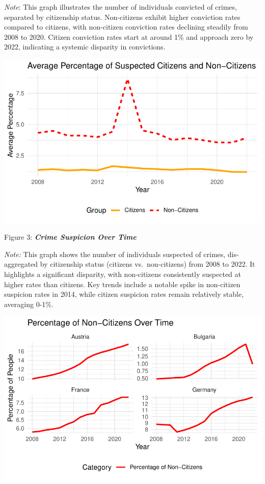 \documentclass[
]{article}
\begin{document}
\emph{Note}: This graph illustrates the number of individuals convicted
of crimes, separated by citizenship status. Non-citizens exhibit higher
conviction rates compared to citizens, with non-citizen conviction rates
declining steadily from 2008 to 2020. Citizen conviction rates start at
around 1\% and approach zero by 2022, indicating a systemic disparity in
convictions.

\includegraphics{DataMan_Project_files/figure-pdf/unnamed-chunk-26-1.pdf}

Figure 3: \textbf{\emph{Crime Suspicion Over Time}}

\emph{Note:} This graph shows the number of individuals suspected of
crimes, dis-aggregated by citizenship status (citizens vs.~non-citizens)
from 2008 to 2022. It highlights a significant disparity, with
non-citizens consistently suspected at higher rates than citizens. Key
trends include a notable spike in non-citizen suspicion rates in 2014,
while citizen suspicion rates remain relatively stable, averaging 0-1\%.

\includegraphics{DataMan_Project_files/figure-pdf/unnamed-chunk-27-1.pdf}
\end{document}
